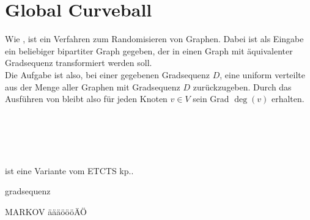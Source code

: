 


\section{Global Curveball }
Wie , ist \gc ein Verfahren zum Randomisieren von Graphen.
Dabei ist als Eingabe ein beliebiger bipartiter Graph gegeben, der in einen 
Graph mit äquivalenter Gradsequenz transformiert werden soll.
\\
Die Aufgabe ist also, bei einer gegebenen Gradsequenz $D$, eine uniform verteilte 
aus der Menge aller Graphen mit Gradsequenz $D$ zurückzugeben. Durch das Ausführen von \gc 
bleibt also für jeden Knoten $v\in V$ sein Grad $\deg(v)$ erhalten. 
\\
\\



~\\
\\
\\\
\\


\gc ist eine Variante vom ETCTS kp..

gradsequenz

MARKOV
äääöööÄÖ

